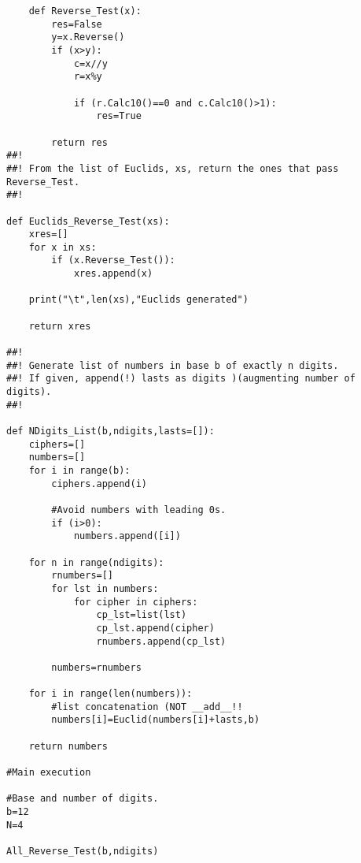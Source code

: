 \begin{lstlisting}
    def Reverse_Test(x):
        res=False
        y=x.Reverse()
        if (x>y):
            c=x//y
            r=x%y

            if (r.Calc10()==0 and c.Calc10()>1):
                res=True
        
        return res
##!
##! From the list of Euclids, xs, return the ones that pass Reverse_Test.
##!

def Euclids_Reverse_Test(xs):
    xres=[]
    for x in xs:
        if (x.Reverse_Test()):
            xres.append(x)

    print("\t",len(xs),"Euclids generated")
    
    return xres

##!
##! Generate list of numbers in base b of exactly n digits.
##! If given, append(!) lasts as digits )(augmenting number of digits).
##!

def NDigits_List(b,ndigits,lasts=[]):
    ciphers=[]
    numbers=[]
    for i in range(b):
        ciphers.append(i)

        #Avoid numbers with leading 0s.
        if (i>0):
            numbers.append([i])

    for n in range(ndigits):
        rnumbers=[]
        for lst in numbers:
            for cipher in ciphers:
                cp_lst=list(lst)
                cp_lst.append(cipher)
                rnumbers.append(cp_lst)

        numbers=rnumbers

    for i in range(len(numbers)):
        #list concatenation (NOT __add__!!
        numbers[i]=Euclid(numbers[i]+lasts,b)

    return numbers

#Main execution

#Base and number of digits.
b=12
N=4

All_Reverse_Test(b,ndigits)
\end{lstlisting}

